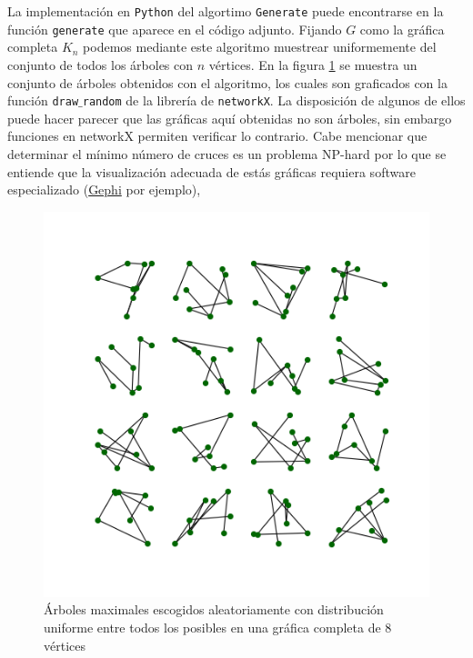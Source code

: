 La implementación en \texttt{Python} del algortimo \texttt{Generate} puede encontrarse en la función \texttt{generate} que aparece en el código adjunto. Fijando $G$ como la gráfica completa $K_{n}$ podemos mediante este algoritmo muestrear uniformemente del conjunto de todos los árboles con $n$ vértices. En la figura \ref{fig:Arboles8} se muestra un conjunto de árboles obtenidos con el algoritmo, los cuales son graficados con la función \texttt{draw$\_$random} de la librería de \texttt{networkX}. La disposición de algunos de ellos puede hacer parecer que las gráficas aquí obtenidas no son árboles, sin embargo funciones en networkX permiten verificar lo contrario. Cabe mencionar que determinar el mínimo número de cruces es un problema NP-hard por lo que se entiende que la visualización adecuada de estás gráficas requiera software especializado (\href{https://gephi.org/}{Gephi} por ejemplo), 

\begin{figure}[h!]
	\centering
	\includegraphics[scale=0.8]{Python/Figures/Arboles8.png}
	\caption{Árboles maximales escogidos aleatoriamente con distribución uniforme entre todos los posibles en una gráfica completa de $8$ vértices}
	\label{fig:Arboles8}
\end{figure}

